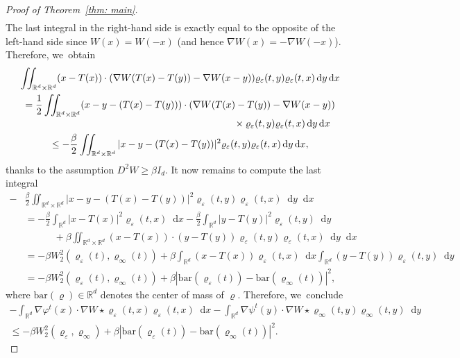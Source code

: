 \documentclass[JEP,XML,SOM,Unicode,published]{cedram}
\newcommand{\dx}[1]{\mathop{}\!\mathrm{d} #1}
\newcommand{\R}{\mathbb{R}}
\theoremstyle{plain}
\theoremstyle{remark}
\begin{document}
\begin{proof}[Proof of Theorem~\ref{thm: main}]
\begin{multline*}
\end{multline*}
The last integral in the right-hand side is exactly equal to the opposite of the left-hand side since $W(x)=W(-x)$ (and hence $\nabla W(x)=-\nabla W(-x)$). Therefore, we~obtain
\begin{multline*}
\iint_{\R^d\times\R^d} (x- T(x))\cdot (\nabla W(T(x)-T(y)) - \nabla W(x-y)) \varrho_\varepsilon(t,y) \varrho_\varepsilon(t,x) \dx y \dx x\\
=\frac 12 \iint_{\R^d\times\R^d} (x-y - (T(x)-T(y)))\cdot (\nabla W(T(x)-T(y)) - \nabla W(x-y))\\[-3pt]
\shoveright{{}\times \varrho_\varepsilon(t,y) \varrho_\varepsilon(t,x) \dx y \dx x}\\
\leq -\frac \beta 2 \iint_{\R^d\times\R^d}|x-y - (T(x)-T(y))|^2\varrho_\varepsilon(t,y) \varrho_\varepsilon(t,x) \dx y \dx x,
\end{multline*}
thanks to the assumption $D^2W\geq \beta I_d$.
It now remains to compute the last integral
\begin{equation*}
\begin{split}
-&\frac \beta 2 \iint_{\R^d\times\R^d}|x-y - (T(x)-T(y))|^2\varrho_\varepsilon(t,y) \varrho_\varepsilon(t,x) \dx y \dx x\\[5pt]
&=- \frac\beta 2 \int_{\R^d} |x-T(x)|^2 \varrho_\varepsilon(t,x)\dx x -\frac \beta 2 \int_{\R^d} |y-T(y)|^2\varrho_{\varepsilon}(t,y) \dx y\\
&\qquad\quad + \beta \iint_{\R^d\times\R^d}(x-T(x))\cdot (y-T(y))\varrho_\varepsilon(t,y) \varrho_\varepsilon(t,x) \dx y \dx x\\
&=-\beta W_2^2(\varrho_\varepsilon(t), \varrho_\infty(t)) + \beta \int_{\R^d} (x - T(x))\varrho_\varepsilon(t,x) \dx x\int_{\R^d} (y - T(y))\varrho_{\varepsilon}(t,y) \dx y\\[5pt]
&=-\beta W_2^2(\varrho_\varepsilon(t), \varrho_\infty(t)) + \beta|\mathrm{bar}(\varrho_\varepsilon(t))- \mathrm{bar}(\varrho_\infty(t))|^2,
\end{split}
\end{equation*}
where $\mathrm{bar}(\varrho)\in\R^d$ denotes the center of mass of $\varrho$. Therefore, we~conclude
\begin{multline*}
-\! \int_{\R^d}\!\! \nabla \varphi^t (x) \cdot \nabla W\star \varrho_\varepsilon (t,x) \varrho_\varepsilon(t,x) \dx x - \!\int_{\R^d}\!\! \nabla \psi^t (y) \cdot \nabla W\star \varrho_\infty (t,y) \varrho_\infty(t,y) \dx y\\[3pt]
\leq -\beta W_2^2(\varrho_\varepsilon,\varrho_\infty) + \beta |\mathrm{bar}(\varrho_\varepsilon(t))- \mathrm{bar}(\varrho_\infty(t))|^2.

\end{multline*}
\end{proof}
\end{document}
